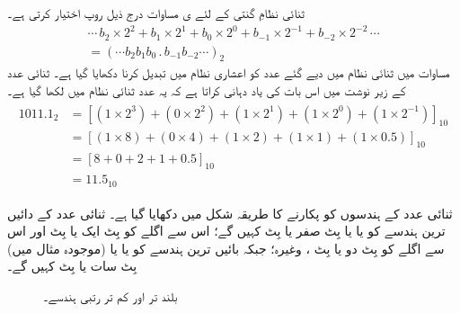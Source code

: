 	 ثنائی نظامِ گنتی کے لئے ی مساوات  درج ذیل روپ اختیار کرتی ہے۔
\begin{multline}\label{مساوات_ثنائی_عمومی_روپ_ثنائی}
\cdots\, b_2\times 2^2+b_1\times 2^1+b_0\times 2^0+b_{-1}\times 2^{-1}+b_{-2}\times 2^{-2}\,\cdots\\
=(\cdots b_2b_1b_0\, .\, b_{-1}b_{-2}\cdots)_{2}
\end{multline}
	مساوات  میں ثنائی نظام میں دیے گئے عدد کو اعشاری نظام میں تبدیل کرنا دکھایا گیا ہے۔ ثنائی عدد کے زیر نوشت میں  اس بات کی یاد دہانی کراتا ہے کہ یہ عدد ثنائی نظام میں لکھا گیا ہے۔
\begin{gather} 
\begin{aligned}\label{مساوات_ثنائی_مثال}
1011.1_2&=[(1\times 2^3)+(0\times 2^2)+(1\times 2^1)+(1\times 2^0)+(1\times 2^{-1})]_{10}\\
&=[(1\times 8)+(0\times 4)+(1\times 2)+(1\times 1)+(1\times 0.5)]_{10}\\
&=[8+0+2+1+0.5]_{10}\\
&=11.5_{10}
\end{aligned}
\end{gather}
	
 ثنائی عدد کے ہندسوں کو پکارنے کا طریقہ شکل  میں دکھایا گیا ہے۔ ثنائی عدد کے دائیں ترین ہندسے کو   یا    یا بِٹ صفر یا بِٹ  کہیں گے؛ اس سے اگلے کو بِٹ ایک یا بِٹ  اور اس سے اگلے کو بِٹ دو یا بِٹ ، وغیرہ؛ جبکہ بائیں ترین ہندسے کو   یا  یا (موجودہ مثال میں) بِٹ سات یا بِٹ  کہیں گے۔

\begin{figure}
\centering
{}
\caption{بلند تر اور کم تر رتبی ہندسے۔}
\label{شکل_ثنائی_رتبہ_ہندسہ}
\end{figure}

